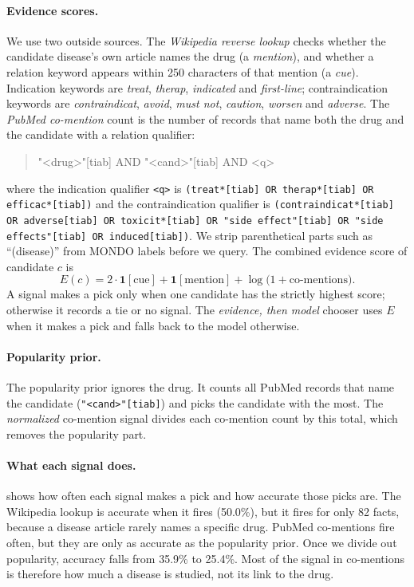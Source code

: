 \paragraph{Evidence scores.}
We use two outside sources. The \emph{Wikipedia reverse lookup} checks whether the candidate disease's own article names the drug (a \emph{mention}), and whether a relation keyword appears within 250 characters of that mention (a \emph{cue}). Indication keywords are \emph{treat}, \emph{therap}, \emph{indicated} and \emph{first-line}; contraindication keywords are \emph{contraindicat}, \emph{avoid}, \emph{must not}, \emph{caution}, \emph{worsen} and \emph{adverse}. The \emph{PubMed co-mention} count is the number of records that name both the drug and the candidate with a relation qualifier:
\begin{quote}
\footnotesize\ttfamily
"<drug>"[tiab] AND "<cand>"[tiab] AND <q>
\end{quote}
where the indication qualifier \texttt{<q>} is \texttt{(treat*[tiab] OR therap*[tiab] OR efficac*[tiab])} and the contraindication qualifier is \texttt{(contraindicat*[tiab] OR adverse[tiab] OR toxicit*[tiab] OR "side effect"[tiab] OR "side effects"[tiab] OR induced[tiab])}. We strip parenthetical parts such as ``(disease)'' from MONDO labels before we query. The combined evidence score of candidate $c$ is
\begin{equation}
E(c)=2\cdot\mathbf{1}[\text{cue}]+\mathbf{1}[\text{mention}]+\log\bigl(1+\text{co-mentions}\bigr).
\end{equation}
A signal makes a pick only when one candidate has the strictly highest score; otherwise it records a tie or no signal. The \emph{evidence, then model} chooser uses $E$ when it makes a pick and falls back to the model otherwise.

\paragraph{Popularity prior.}
The popularity prior ignores the drug. It counts all PubMed records that name the candidate (\texttt{"<cand>"[tiab]}) and picks the candidate with the most. The \emph{normalized} co-mention signal divides each co-mention count by this total, which removes the popularity part.

\paragraph{What each signal does.}
 shows how often each signal makes a pick and how accurate those picks are. The Wikipedia lookup is accurate when it fires (50.0\%), but it fires for only 82 facts, because a disease article rarely names a specific drug. PubMed co-mentions fire often, but they are only as accurate as the popularity prior. Once we divide out popularity, accuracy falls from 35.9\% to 25.4\%. Most of the signal in co-mentions is therefore how much a disease is studied, not its link to the drug.

